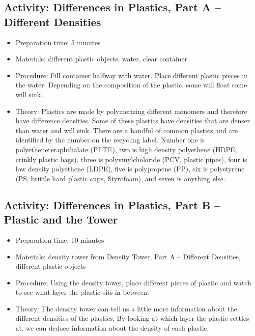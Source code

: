 \begin{itemize}
{\begin{itemize}
\begin{itemize}
{\subsection{Activity: Differences in Plastics, Part A – Different Densities}
\begin{itemize}
\item{Preparation time: 5 minutes}
\item{Materials: different plastic objects, water, clear container}
\item{Procedure: Fill container halfway with water. Place different plastic pieces in the water. Depending on the composition of the plastic, some will float some will sink. }
\item{Theory: Plastics are made by polymerizing different monomers and therefore have difference densities. Some of these plastics have densities that are denser than water and will sink. There are a handful of common plastics and are identified by the number on the recycling label. Number one is polyetheneteraphthalate (PETE), two is high density polyethene (HDPE, crinkly plastic bags), three is polyvinylcholoride (PCV, plastic pipes), four is low density polyethene (LDPE), five is polypropene (PP), six is polystyrene (PS, brittle hard plastic cups, Styrofoam), and seven is anything else. }
\end{itemize}

\subsection{Activity: Differences in Plastics, Part B – Plastic and the Tower}
\begin{itemize}
\item{Preparation time: 10 minutes}
\item{Materials: density tower from Density Tower, Part A – Different Densities, different plastic objects}
\item{Procedure: Using the density tower, place different pieces of plastic and watch to see what layer the plastic sits in between.}
\item{Theory: The density tower can tell us a little more information about the different densities of the plastics. By looking at which layer the plastic settles at, we can deduce information about the density of each plastic.}
\end{itemize}

}
\end{itemize}
\end{itemize}}
\end{itemize}
